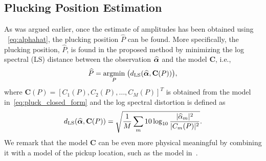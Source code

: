 \documentclass{article}
\begin{document}
\subsection{Plucking Position Estimation} %
\label{sec:proposed_estimation_of_pluck_amplitude}
\vspace{-.6mm}
As was argued earlier, once the estimate of amplitudes has been obtained using ~\eqref{eq:alphahat}, the plucking position $\widehat{P}$ can be found. More specifically, the plucking position, $\widehat{P}$, is found in the proposed method by minimizing the log spectral (LS) distance between the observation $\text{\boldmath${\widehat\alpha}$}$ and the model $\mathbf{C}$, i.e., 
\begin{equation}
    \widehat{P} = \underset{P}{\operatorname{argmin}}\;{\big(d_{\textup{LS}}(\text{\boldmath${\widehat\alpha}$},\mathbf{C}(P))\big)},
\end{equation}
where $\mathbf{C}(P) = [C_1(P),C_2(P),\dots,C_M(P)]^T$ is obtained from the model in~\eqref{eq:pluck_closed_form} and the log spectral distortion is defined as
\begin{equation}
    d_{\textup{LS}}(\text{\boldmath${\widehat\alpha}$},\mathbf{C}(P)) = \sqrt{ \frac{1}{M} \sum_m 10\log_{10} \frac{\lvert\widehat{\alpha}_m\rvert^2}{\lvert C_m(P)\rvert^2} }.
\end{equation} 
We remark that the model $\mathbf{C}$ can be even more physical meaningful by combining it with a model of the pickup location, such as the model in~\cite{DBLP:conf/icassp/MohamadDH17}.\vspace{-2mm}
%
%
%
%
\end{document}
